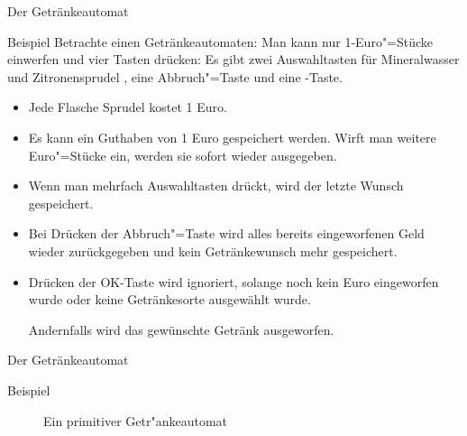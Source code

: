 \begin{frame}{Der Getränkeautomat}

	\begin{exampleblock}{Beispiel} \small
		Betrachte einen Getränkeautomaten:
		Man kann nur 1-Euro"=Stücke einwerfen und vier Tasten drücken: Es gibt
		zwei Auswahltasten für Mineralwasser \tasteRein{} und Zitronensprudel
		\tasteZitro{}, eine Abbruch"=Taste \tasteC{} und eine \tasteOK-Taste.

	
	\begin{itemize}
	\item Jede Flasche Sprudel kostet 1 Euro.
	\item Es kann ein Guthaben von 1 Euro gespeichert werden. Wirft man
	  weitere Euro"=Stücke ein, werden sie sofort wieder ausgegeben.
	\item Wenn man mehrfach Auswahltasten drückt, wird der letzte Wunsch
	  gespeichert.
	\item Bei Drücken der Abbruch"=Taste wird alles bereits eingeworfenen
	  Geld wieder zurückgegeben und kein Getränkewunsch mehr gespeichert.
	\item Drücken der OK-Taste wird ignoriert, solange noch kein Euro
	  eingeworfen wurde oder keine Getränkesorte ausgewählt wurde.

	  Andernfalls wird das gewünschte Getränk ausgeworfen.
	\end{itemize} 
	\end{exampleblock}
\end{frame}

\begin{frame}{Der Getränkeautomat}

	\begin{exampleblock}{Beispiel}
		\begin{figure}[ht]
  \centering
  \caption{Ein primitiver Getr"ankeautomat}
  \label{fig:getraenkeautomat}
\end{figure}
	\end{exampleblock}
\end{frame}

